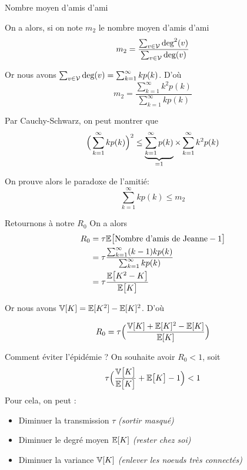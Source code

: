\documentclass[10pt]{beamer}
\begin{document}
\begin{frame}{Nombre moyen d'amis d'ami}

  {\small
  On a alors, si on note $m_2$ le nombre moyen d'amis d'ami
  \[
    m_2 = \dfrac{\sum_{v \in \mathcal{V}} \text{deg}^2(v)}{\sum_{v \in \mathcal{V}} \text{deg}(v)}
  \]

  Or nous avons $\sum_{v \in \mathcal{V}} \text{deg}(v) = \sum_{k=1}^\infty kp(k)$. D'où
  \[
    m_2 = \dfrac{\sum_{k=1}^\infty k^2 p(k)}{\sum_{k=1}^\infty k p(k)}
  \]

  \vspace{.2cm}
  Par Cauchy-Schwarz, on peut montrer que
  \[
    \Big(\sum_{k=1}^\infty k p(k)\Big)^2 \leq \underbrace{\sum_{k=1}^\infty p(k)}_{=1} \times \sum_{k=1}^\infty k^2 p(k)
  \]

  On prouve alors le paradoxe de l'amitié:
  \[
    \sum_{k=1}^\infty k p(k) \leq m_2
  \]
  }
\end{frame}

\begin{frame}{Retournons à notre $R_0$}
  On a alors
  \[
    \begin{aligned}
      R_0 &= \tau \mathbb{E}\big[\text{Nombre d'amis de Jeanne} - 1\big] \\
          &= \tau \dfrac{\sum_{k=1}^\infty (k-1) k p(k)}{\sum_{k=1}^\infty k p(k)} \\
          &= \tau \dfrac{\mathbb{E}\big[K^2 - K\big]}{\mathbb{E}\big[K\big]}
    \end{aligned}
  \]

  \pause
  \vspace{.6cm}
  Or nous avons $\mathbb{V}[K] = \mathbb{E}[K^2] - \mathbb{E}[K]^2$.
  D'où
  \begin{block}{}
  \[
    R_0 = \tau \Big(\dfrac{\mathbb{V}[K] + \mathbb{E}[K]^2 - \mathbb{E}[K]}{\mathbb{E}[K]}\Big)
  \]
  \end{block}
\end{frame}

\begin{frame}{Comment éviter l'épidémie ? }
  On souhaite avoir $R_0 < 1$, soit
  \[
    \tau \Big(\dfrac{\mathbb{V}\big[K\big]}{\mathbb{E}\big[K\big]} + \mathbb{E}\big[K\big] - 1\Big) < 1
  \]
  Pour cela, on peut :
  \begin{itemize}
    \item Diminuer la transmission $\tau$ \emph{(sortir masqué)}
    \item Diminuer le degré moyen $\mathbb{E}[K]$ \emph{(rester chez soi)}
    \item Diminuer la variance $\mathbb{V}[K]$ \emph{(enlever les noeuds très connectés)}
  \end{itemize}
\end{frame}
\end{document}
